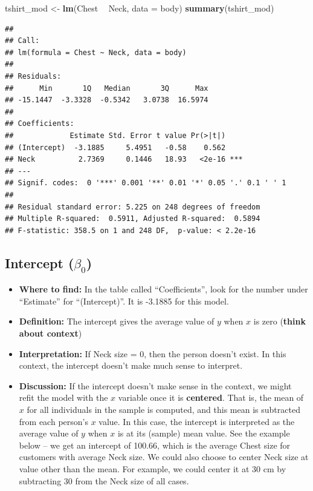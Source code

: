 \documentclass[]{book}
\newenvironment{Shaded}{\begin{snugshade}}{\end{snugshade}}
\newcommand{\DataTypeTok}[1]{\textcolor[rgb]{0.13,0.29,0.53}{#1}}
\newcommand{\KeywordTok}[1]{\textcolor[rgb]{0.13,0.29,0.53}{\textbf{#1}}}
\newcommand{\NormalTok}[1]{#1}
\newcommand{\OperatorTok}[1]{\textcolor[rgb]{0.81,0.36,0.00}{\textbf{#1}}}
\newcommand{\StringTok}[1]{\textcolor[rgb]{0.31,0.60,0.02}{#1}}
\providecommand{\tightlist}{%
  \setlength{\itemsep}{0pt}\setlength{\parskip}{0pt}}
\begin{document}
\begin{Shaded}
\begin{Highlighting}[]
\NormalTok{tshirt_mod <-}\StringTok{ }\KeywordTok{lm}\NormalTok{(Chest }\OperatorTok{~}\StringTok{ }\NormalTok{Neck, }\DataTypeTok{data =}\NormalTok{ body)}
\KeywordTok{summary}\NormalTok{(tshirt_mod)}
\end{Highlighting}
\end{Shaded}

\begin{verbatim}
## 
## Call:
## lm(formula = Chest ~ Neck, data = body)
## 
## Residuals:
##      Min       1Q   Median       3Q      Max 
## -15.1447  -3.3328  -0.5342   3.0738  16.5974 
## 
## Coefficients:
##             Estimate Std. Error t value Pr(>|t|)    
## (Intercept)  -3.1885     5.4951   -0.58    0.562    
## Neck          2.7369     0.1446   18.93   <2e-16 ***
## ---
## Signif. codes:  0 '***' 0.001 '**' 0.01 '*' 0.05 '.' 0.1 ' ' 1
## 
## Residual standard error: 5.225 on 248 degrees of freedom
## Multiple R-squared:  0.5911, Adjusted R-squared:  0.5894 
## F-statistic: 358.5 on 1 and 248 DF,  p-value: < 2.2e-16
\end{verbatim}

\hypertarget{intercept-beta_0}{%
\subsection{\texorpdfstring{Intercept (\(\beta_0\))}{Intercept (\textbackslash{}beta\_0)}}\label{intercept-beta_0}}

\begin{itemize}
\tightlist
\item
  \textbf{Where to find:} In the table called ``Coefficients'', look for the number under ``Estimate'' for ``(Intercept)''. It is -3.1885 for this model.
\item
  \textbf{Definition:} The intercept gives the average value of \(y\) when \(x\) is zero (\textbf{think about context})
\item
  \textbf{Interpretation:} If Neck size = 0, then the person doesn't exist. In this context, the intercept doesn't make much sense to interpret.
\item
  \textbf{Discussion:} If the intercept doesn't make sense in the context, we might refit the model with the \(x\) variable once it is \textbf{centered}. That is, the mean of \(x\) for all individuals in the sample is computed, and this mean is subtracted from each person's \(x\) value. In this case, the intercept is interpreted as the average value of \(y\) when \(x\) is at its (sample) mean value. See the example below -- we get an intercept of 100.66, which is the average Chest size for customers with average Neck size. We could also choose to center Neck size at value other than the mean. For example, we could center it at 30 cm by subtracting 30 from the Neck size of all cases.
\end{itemize}
\end{document}
